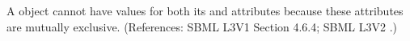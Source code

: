 A \Species object cannot have values for both its
 and  attributes because
these attributes are mutually exclusive.  (References: SBML L3V1 Section 4.6.4; SBML L3V2
.)
